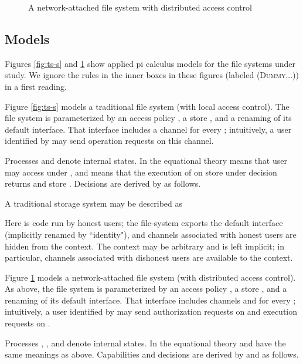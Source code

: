 \documentclass[10pt]{article}
\begin{document}
\begin{figure}
\hspace{-0.5cm}\fbox{\parbox{13.0cm}{\small



\fbox{\parbox{12.75cm}{


}}
}}
\caption{A network-attached file system with distributed access control}
   \label{fig:nas-s}
\vspace{-0.3cm}
\end{figure}

\subsection{Models}

Figures \ref{fig:ts-s} and \ref{fig:nas-s} show applied pi calculus models for the file systems under study. We ignore the rules in the inner boxes in these figures (labeled (\textsc{Dummy}...)) in a first reading.

Figure \ref{fig:ts-s} models a traditional file system (with local access control). The file system is parameterized by an access policy , a store , and a renaming  of its default interface. That interface includes a channel  for every ; intuitively, a user identified by  may send operation requests on this channel. 

Processes  and  denote internal states. 
In the equational theory  means that user  may access  under , and  means that the execution of  on store  under decision  returns  and store . Decisions are derived by  as follows.

A traditional storage system may be described as 

Here  is code run by honest users; the file-system exports the default interface (implicitly renamed by ``identity"), and channels associated with honest users are hidden from the context. The context may be arbitrary and is left implicit; in particular, channels associated with dishonest users are available to the context.

Figure \ref{fig:nas-s} models a network-attached file system (with distributed access control). As above, the file system is parameterized by an access policy , a store , and a renaming  of its default interface. That interface includes channels  and  for every ; intuitively, a user identified by  may send authorization requests on  and execution requests on . 

Processes , , and  denote internal states. 
In the equational theory  and  have the same meanings as above. Capabilities and decisions are derived by  and   as follows.
\end{document}
